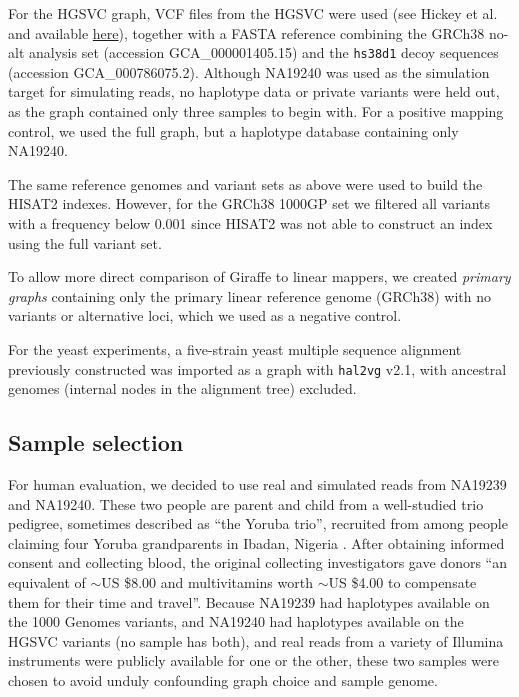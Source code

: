 \documentclass[11pt]{ucscthesis}
\newcommand{\vocab}[1]{\emph{#1}}
\begin{document}
For the HGSVC graph, VCF files from the HGSVC were used (see Hickey et al.\cite{hickey_vgsv_2020} and available \href{https://github.com/vgteam/sv-genotyping-paper/tree/master/human/hgsvc}{{here}}), together with a FASTA reference combining the GRCh38 no-alt analysis set (accession GCA\_000001405.15) and the \texttt{hs38d1} decoy sequences (accession GCA\_000786075.2).
Although NA19240 was used as the simulation target for simulating reads, no haplotype data or private variants were held out, as the graph contained only three samples to begin with. For a positive mapping control, we used the full graph, but a haplotype database containing only NA19240.

The same reference genomes and variant sets as above were used to build the HISAT2 indexes.
However, for the GRCh38 1000GP set we filtered all variants with a frequency below 0.001 since HISAT2 was not able to construct an index using the full variant set.

To allow more direct comparison of Giraffe to linear mappers, we created \vocab{primary graphs} containing only the primary linear reference genome (GRCh38) with no variants or alternative loci, which we used as a negative control.

For the yeast experiments, a five-strain yeast multiple sequence alignment previously constructed \cite{hickey_vgsv_2020} was imported as a graph with \texttt{hal2vg} v2.1\cite{hickey_vgsv_2020}, with ancestral genomes (internal nodes in the alignment tree) excluded.


\subsection{Sample selection}

For human evaluation, we decided to use real and simulated reads from NA19239 and NA19240. These two people are parent and child from a well-studied trio pedigree, sometimes described as ``the Yoruba trio'', recruited from among people claiming four Yoruba grandparents in Ibadan, Nigeria \cite{international2005haplotype,abyzov2011cnvnator}.
After obtaining informed consent and collecting blood, the original collecting investigators gave donors ``an equivalent of $\sim$US \$8.00 and multivitamins worth $\sim$US \$4.00 to compensate them for their time and travel''\cite{international2004integrating}.
Because NA19239 had haplotypes available on the 1000 Genomes variants, and NA19240 had haplotypes available on the HGSVC variants (no sample has both), and real reads from a variety of Illumina instruments were publicly available for one or the other, these two samples were chosen to avoid unduly confounding graph choice and sample genome.
\end{document}
